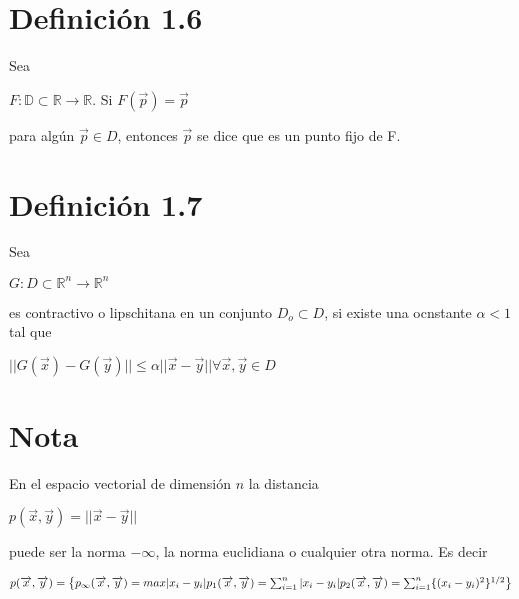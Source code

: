 \documentclass[12pt]{article}
\begin{document}
    \section*{Definición 1.6}
    Sea
    \begin{center}
         $F: \mathbb{D} \subset \mathbb{R} \rightarrow \mathbb{R}$. Si $F(\overrightarrow{p})= \overrightarrow{p}$
    \end{center}
    para algún $\overrightarrow{p} \in D$, entonces $\overrightarrow{p}$ se dice que es un punto fijo de F.
    \section*{Definición 1.7}
    Sea
    \begin{center}
        $G: D \subset \mathbb{R}^{n} \rightarrow \mathbb{R}^{n}$
    \end{center}
    es contractivo o lipschitana en un conjunto $D_{o} \subset D$, si existe una ocnstante $\alpha < 1$ tal que
    \begin{center}
        $||G(\overrightarrow{x}) - G(\overrightarrow{y})|| \leq \alpha||\overrightarrow{x} - \overrightarrow{y}|| \forall \overrightarrow{x}, \overrightarrow{y} \in D$
    \end{center}
    \section*{Nota}
    En el espacio vectorial de dimensión $n$ la distancia 
    \begin{center}
        $p(\overrightarrow{x}, \overrightarrow{y}) = ||\overrightarrow{x} - \overrightarrow{y}||$
    \end{center}
    puede ser la norma $- \infty$, la norma euclidiana o cualquier otra norma. Es decir
    \begin{center}
        $p(\overrightarrow{x}, \overrightarrow{y})=\left\{ 
            p_{\infty}(\overrightarrow{x}, \overrightarrow{y}) = max|x_{i}-y_{i}| \linebreak
            p_{1}(\overrightarrow{x}, \overrightarrow{y}) = \sum_{i = 1}^{n}|x_{i} - y_{i}|   \linebreak
            p_{2}(\overrightarrow{x}, \overrightarrow{y}) = \sum_{i = 1}^{n}\{(x_{i} - y_{i})^{2}\}^{1/2}\right\}
        $
    \end{center}
\end{document}
